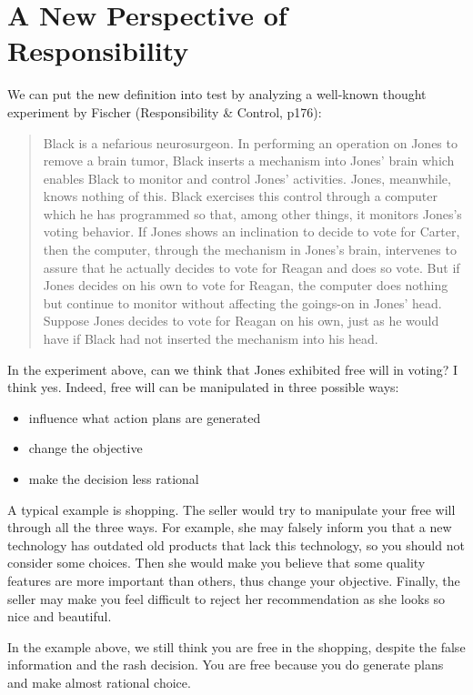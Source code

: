 \section{A New Perspective of Responsibility}

We can put the new definition into test by analyzing a well-known thought experiment by Fischer (Responsibility \& Control, p176):

\begin{quote}
Black is a nefarious neurosurgeon. In performing an operation on Jones to remove a brain tumor, Black inserts a mechanism into Jones’ brain which enables Black to monitor and control Jones’ activities. Jones, meanwhile, knows nothing of this. Black exercises this control through a computer which he has programmed so that, among other things, it monitors Jones’s voting behavior. If Jones shows an inclination to decide to vote for Carter, then the computer, through the mechanism in Jones’s brain, intervenes to assure that he actually decides to vote for Reagan and does so vote. But if Jones decides on his own to vote for Reagan, the computer does nothing but continue to monitor without affecting the goings-on in Jones’ head. Suppose Jones decides to vote for Reagan on his own, just as he would have if Black had not inserted the mechanism into his head.
\end{quote}

In the experiment above, can we think that Jones exhibited free will in voting? I think yes. Indeed, free will can be manipulated in three possible ways:

\begin{itemize}
\item influence what action plans are generated
\item change the objective
\item make the decision less rational
\end{itemize}

A typical example is shopping. The seller would try to manipulate your free will through all the three ways. For example, she may falsely inform you that a new technology has outdated old products that lack this technology, so you should not consider some choices. Then she would make you believe that some quality features are more important than others, thus change your objective. Finally, the seller may make you feel difficult to reject her recommendation as she looks so nice and beautiful.

In the example above, we still think you are free in the shopping, despite the false information and the rash decision. You are free because you do generate plans and make almost rational choice.

